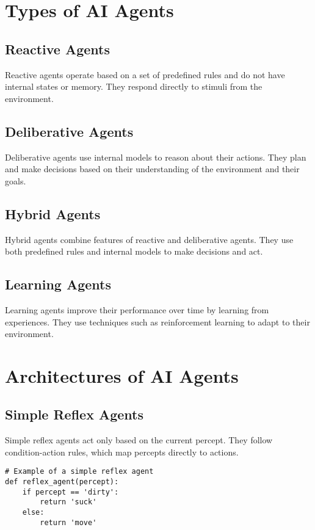\section{Types of AI Agents}

\subsection{Reactive Agents}
Reactive agents operate based on a set of predefined rules and do not have internal states or memory. They respond directly to stimuli from the environment.

\subsection{Deliberative Agents}
Deliberative agents use internal models to reason about their actions. They plan and make decisions based on their understanding of the environment and their goals.

\subsection{Hybrid Agents}
Hybrid agents combine features of reactive and deliberative agents. They use both predefined rules and internal models to make decisions and act.

\subsection{Learning Agents}
Learning agents improve their performance over time by learning from experiences. They use techniques such as reinforcement learning to adapt to their environment.

\section{Architectures of AI Agents}

\subsection{Simple Reflex Agents}
Simple reflex agents act only based on the current percept. They follow condition-action rules, which map percepts directly to actions.

\begin{verbatim}
# Example of a simple reflex agent
def reflex_agent(percept):
    if percept == 'dirty':
        return 'suck'
    else:
        return 'move'
\end{verbatim}

